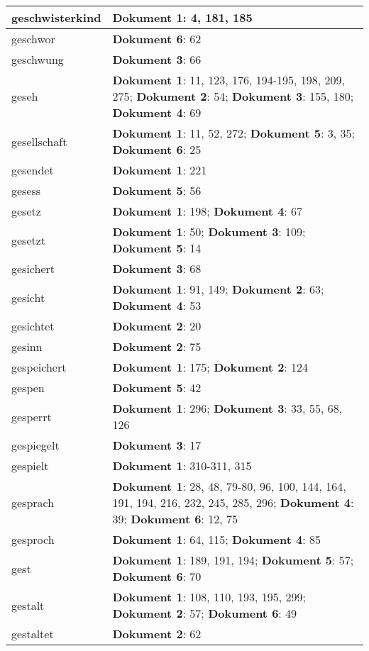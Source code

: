 \documentclass[a5paper]{article}
\begin{document}
\begin{longtable}[l]{|l|p{3in}|}
\hline
geschwisterkind & \textbf{Dokument 1}: 4, 181, 185 \\
\hline
geschwor & \textbf{Dokument 6}: 62 \\
\hline
geschwung & \textbf{Dokument 3}: 66 \\
\hline
geseh & \textbf{Dokument 1}: 11, 123, 176, 194-195, 198, 209, 275; \textbf{Dokument 2}: 54; \textbf{Dokument 3}: 155, 180; \textbf{Dokument 4}: 69 \\
\hline
gesellschaft & \textbf{Dokument 1}: 11, 52, 272; \textbf{Dokument 5}: 3, 35; \textbf{Dokument 6}: 25 \\
\hline
gesendet & \textbf{Dokument 1}: 221 \\
\hline
gesess & \textbf{Dokument 5}: 56 \\
\hline
gesetz & \textbf{Dokument 1}: 198; \textbf{Dokument 4}: 67 \\
\hline
gesetzt & \textbf{Dokument 1}: 50; \textbf{Dokument 3}: 109; \textbf{Dokument 5}: 14 \\
\hline
gesichert & \textbf{Dokument 3}: 68 \\
\hline
gesicht & \textbf{Dokument 1}: 91, 149; \textbf{Dokument 2}: 63; \textbf{Dokument 4}: 53 \\
\hline
gesichtet & \textbf{Dokument 2}: 20 \\
\hline
gesinn & \textbf{Dokument 2}: 75 \\
\hline
gespeichert & \textbf{Dokument 1}: 175; \textbf{Dokument 2}: 124 \\
\hline
gespen & \textbf{Dokument 5}: 42 \\
\hline
gesperrt & \textbf{Dokument 1}: 296; \textbf{Dokument 3}: 33, 55, 68, 126 \\
\hline
gespiegelt & \textbf{Dokument 3}: 17 \\
\hline
gespielt & \textbf{Dokument 1}: 310-311, 315 \\
\hline
gesprach & \textbf{Dokument 1}: 28, 48, 79-80, 96, 100, 144, 164, 191, 194, 216, 232, 245, 285, 296; \textbf{Dokument 4}: 39; \textbf{Dokument 6}: 12, 75 \\
\hline
gesproch & \textbf{Dokument 1}: 64, 115; \textbf{Dokument 4}: 85 \\
\hline
gest & \textbf{Dokument 1}: 189, 191, 194; \textbf{Dokument 5}: 57; \textbf{Dokument 6}: 70 \\
\hline
gestalt & \textbf{Dokument 1}: 108, 110, 193, 195, 299; \textbf{Dokument 2}: 57; \textbf{Dokument 6}: 49 \\
\hline
gestaltet & \textbf{Dokument 2}: 62 \\

\end{longtable}
\end{document}
